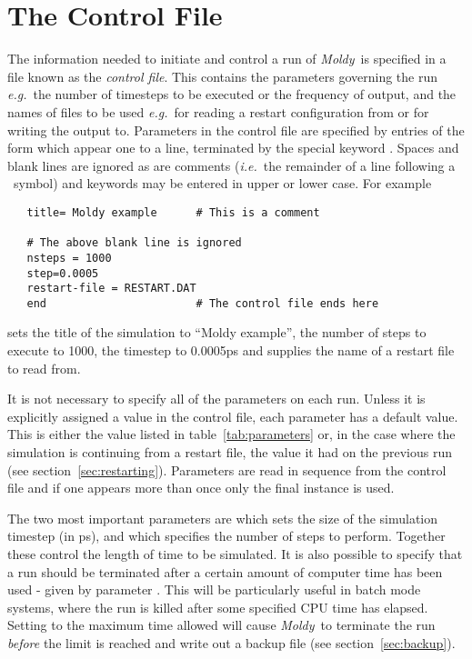 \documentclass[a4paper,twoside]{report}
\newcommand{\moldy}{\emph{Moldy}}
\newcommand{\eg}{\emph{e.g.}}
\newcommand{\ie}{\emph{i.e.}}
\begin{document}
\section{The Control File}%
\label{sec:control}

The information needed to initiate and control a run of \moldy\ is
specified in a file known as the \emph{control file}. This contains
the parameters governing the run \eg\ the number of timesteps to be
executed or the frequency of output, and the names of files to be used
\eg\ for reading a restart configuration from or for writing the
output to. Parameters in the control file are specified by entries of
the form  which appear one to a line,
terminated by the special keyword .  Spaces and blank
lines are ignored as are comments (\ie\ the remainder of a line
following a \Lit{\#}~symbol) and keywords may be entered in upper
or lower case. For example
\begin{verbatim}
   title= Moldy example      # This is a comment

   # The above blank line is ignored
   nsteps = 1000
   step=0.0005
   restart-file = RESTART.DAT
   end                       # The control file ends here
\end{verbatim}
sets the title of the simulation to ``Moldy example'', the number of
steps to execute to 1000, the timestep to 0.0005ps and supplies the
name of a restart file to read from.

It is not necessary to specify all of the parameters on each run.
Unless it is explicitly assigned a value in the control file, each
parameter has a default value.  This is either the value listed in
table~\ref{tab:parameters} or, in the case where the simulation is
continuing from a restart file, the value it had on the previous run
(see section~\ref{sec:restarting}). Parameters are read in sequence
from the control file and if one appears more than once only the final
instance is used.

The two most important parameters are  which sets the
size of the simulation timestep (in ps), and  which
specifies the number of steps to perform.  Together these control the
length of time to be simulated.  It is also possible to specify that a
run should be terminated after a certain amount of computer time has
been used - given by parameter .  This will be
particularly useful in batch mode systems, where the run is killed
after some specified CPU time has elapsed.  Setting 
to the maximum time allowed will cause \moldy\ to terminate the run
\emph{before} the limit is reached and write out a backup file (see
section~\ref{sec:backup}).
\end{document}
